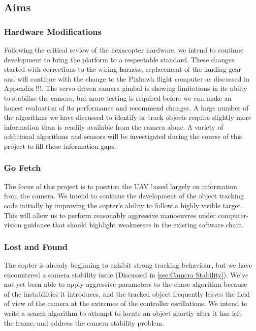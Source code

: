 \documentclass[a4paper, 11pt, titlepage]{article}
\begin{document}
  \subsection{Aims}

    \subsubsection{Hardware Modifications}
      Following the critical review of the hexacopter hardware, we intend to continue development to bring the platform to a respectable standard. These changes started with corrections to the wiring harness, replacement of the landing gear and will continue with the change to the Pixhawk flight computer as discussed in Appendix !!!.
      The servo driven camera gimbal is showing limitations in its abilty to stabilise the camera, but more testing is required before we can make an honest evaluation of its performance and recommend changes.
      A large number of the algorithms we have discussed to identify or track objects require slightly more information than is readily available from the camera alone.  A variety of additional algorithms and sensors will be investigated during the course of this project to fill these information gaps.

    \subsubsection{Go Fetch}
      The focus of this project is to position the UAV based largely on information from the camera.  We intend to continue the development of the object tracking code initially by improving the copter's ability to follow a highly visible target.  This will allow us to perform reasonably aggressive manoeuvres under computer-vision guidance that should highlight weaknesses in the existing software chain.

    \subsubsection{Lost and Found}
    \label{sec:Lost and Found}
      The copter is already beginning to exhibit strong tracking behaviour, but we have encountered a camera stability issue (Discussed in \ref{sec:Camera Stability}).
      We've not yet been able to apply aggressive parameters to the chase algorithm because of the instabilities it introduces, and the tracked object frequently leaves the field of view of the camera at the extremes of the controller oscillations.
      We intend to write a search algorithm to attempt to locate an object shortly after it has left the frame, and address the camera stability problem.
\end{document}
